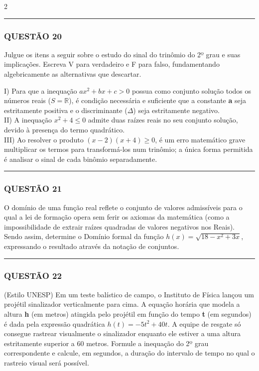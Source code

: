 \documentclass[11pt, a4paper]{article}
\begin{document}
\begin{multicols*}{2}
\vspace{0cm} \noindent\textcolor{CorLinha}{\rule{\linewidth}{0.5pt}} \vspace{-0.2cm}
\subsubsection*{QUESTÃO 20}
Julgue os itens a seguir sobre o estudo do sinal do trinômio do 2º grau e suas implicações. Escreva V para verdadeiro e F para falso, fundamentando algebricamente as alternativas que descartar.

I) Para que a inequação $ ax^2 + bx + c > 0 $ possua como conjunto solução todos os números reais ($ S = \mathbb{R} $), é condição necessária e suficiente que a constante \textbf{a} seja estritamente positiva e o discriminante ($ \Delta $) seja estritamente negativo.\\[0.3cm]
II) A inequação $ x^2 + 4 \le 0 $ admite duas raízes reais no seu conjunto solução, devido à presença do termo quadrático.\\[0.3cm]
III) Ao resolver o produto $ (x - 2)(x + 4) \ge 0 $, é um erro matemático grave multiplicar os termos para transformá-los num trinômio; a única forma permitida é analisar o sinal de cada binômio separadamente.

\vspace{0cm} \noindent\textcolor{CorLinha}{\rule{\linewidth}{0.5pt}} \vspace{-0.2cm}
\subsubsection*{QUESTÃO 21}
O domínio de uma função real reflete o conjunto de valores admissíveis para o qual a lei de formação opera sem ferir os axiomas da matemática (como a impossibilidade de extrair raízes quadradas de valores negativos nos Reais). Sendo assim, determine o Domínio formal da função $ h(x) = \sqrt{18 - x^2 + 3x} $, expressando o resultado através da notação de conjuntos.

\vspace{0cm} \noindent\textcolor{CorLinha}{\rule{\linewidth}{0.5pt}} \vspace{-0.2cm}
\subsubsection*{QUESTÃO 22}
(Estilo UNESP) Em um teste balístico de campo, o Instituto de Física lançou um projétil sinalizador verticalmente para cima. A equação horária que modela a altura \textbf{h} (em metros) atingida pelo projétil em função do tempo \textbf{t} (em segundos) é dada pela expressão quadrática $ h(t) = -5t^2 + 40t $. A equipe de resgate só consegue rastrear visualmente o sinalizador enquanto ele estiver a uma altura estritamente superior a 60 metros. Formule a inequação do 2º grau correspondente e calcule, em segundos, a duração do intervalo de tempo no qual o rastreio visual será possível.


\end{multicols*}
\end{document}
